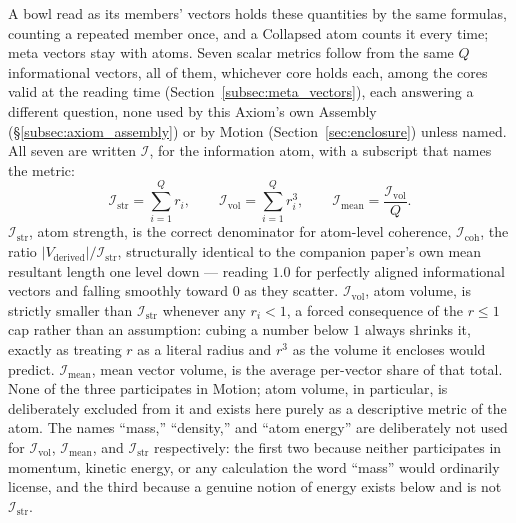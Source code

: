 \documentclass[12pt, a4paper]{article}
\begin{document}
A bowl read as its members' vectors holds these quantities by the same formulas, counting a repeated member once, and a Collapsed atom counts it every time; meta vectors stay with atoms.
Seven scalar metrics follow from the same $Q$ informational vectors, all of them, whichever core holds each, among the cores valid at the reading time (Section~\ref{subsec:meta_vectors}),
each answering a different question, none used by this Axiom's own
Assembly (\S\ref{subsec:axiom_assembly}) or by Motion
(Section~\ref{sec:enclosure}) unless named. All seven are written $\mathcal{I}$, for the information atom, with a subscript that names the metric:
\[
\mathcal{I}_{\mathrm{str}} = \sum_{i=1}^Q r_i, \qquad
\mathcal{I}_{\mathrm{vol}} = \sum_{i=1}^Q r_i^3, \qquad
\mathcal{I}_{\mathrm{mean}} = \frac{\mathcal{I}_{\mathrm{vol}}}{Q}.
\]
$\mathcal{I}_{\mathrm{str}}$, atom strength, is the correct denominator for
atom-level coherence, $\mathcal{I}_{\mathrm{coh}}$, the ratio $\lvert V_{\text{derived}}\rvert /
\mathcal{I}_{\mathrm{str}}$, structurally identical to the companion paper's own
mean resultant length one level down --- reading $1.0$ for perfectly
aligned informational vectors and falling smoothly toward $0$ as they
scatter. $\mathcal{I}_{\mathrm{vol}}$, atom volume, is strictly
smaller than $\mathcal{I}_{\mathrm{str}}$ whenever any $r_i<1$, a forced
consequence of the $r\le 1$ cap rather than an assumption: cubing a
number below $1$ always shrinks it, exactly as treating $r$ as a
literal radius and $r^3$ as the volume it encloses would predict.
$\mathcal{I}_{\mathrm{mean}}$, mean vector volume, is the average per-vector
share of that total. None of the three participates in Motion; atom
volume, in particular, is deliberately excluded from it and exists
here purely as a descriptive metric of the atom. The names ``mass,''
``density,'' and ``atom energy'' are deliberately not used for
$\mathcal{I}_{\mathrm{vol}}$, $\mathcal{I}_{\mathrm{mean}}$, and
$\mathcal{I}_{\mathrm{str}}$ respectively: the first two because neither
participates in momentum, kinetic energy, or any calculation the word
``mass'' would ordinarily license, and the third because a genuine
notion of energy exists below and is not $\mathcal{I}_{\mathrm{str}}$.
\end{document}
